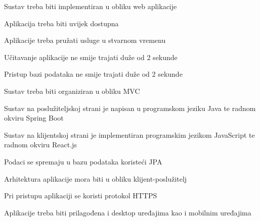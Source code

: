 			\begin{packed_item}
			\item Sustav treba biti implementiran u obliku web aplikacije
			\item Aplikacija treba biti uvijek dostupna
			\item Aplikacije treba pružati usluge u stvarnom vremenu
			\item Učitavanje aplikacije ne smije trajati duže od 2 sekunde
			\item Pristup bazi podataka ne smije trajati duže od 2 sekunde
			\item Sustav treba biti organiziran u obliku MVC
			\item Sustav na poslužiteljskoj strani je napisan u programskom jeziku Java te radnom okviru Spring Boot
			\item Sustav na klijentskoj strani je implementiran programskim jezikom JavaScript te radnom okviru React.js
			\item Podaci se spremaju u bazu podataka koristeći JPA
			\item Arhitektura aplikacije mora biti u obliku klijent-poslužitelj
			\item Pri pristupu aplikaciji se koristi protokol HTTPS
			\item Aplikacije treba biti prilagođena i desktop uređajima kao i mobilnim uređajima
			\end{packed_item}
			 
			 
			 
	